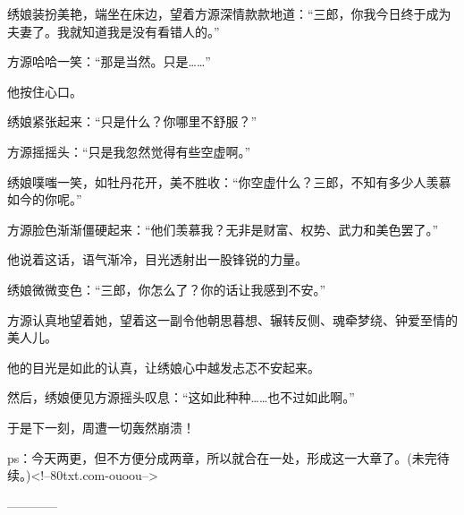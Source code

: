 \begin{this_body}
绣娘装扮美艳，端坐在床边，望着方源深情款款地道：“三郎，你我今日终于成为夫妻了。我就知道我是没有看错人的。”

方源哈哈一笑：“那是当然。只是……”

他按住心口。

绣娘紧张起来：“只是什么？你哪里不舒服？”

方源摇摇头：“只是我忽然觉得有些空虚啊。”

绣娘噗嗤一笑，如牡丹花开，美不胜收：“你空虚什么？三郎，不知有多少人羡慕如今的你呢。”

方源脸色渐渐僵硬起来：“他们羡慕我？无非是财富、权势、武力和美色罢了。”

他说着这话，语气渐冷，目光透射出一股锋锐的力量。

绣娘微微变色：“三郎，你怎么了？你的话让我感到不安。”

方源认真地望着她，望着这一副令他朝思暮想、辗转反侧、魂牵梦绕、钟爱至情的美人儿。

他的目光是如此的认真，让绣娘心中越发忐忑不安起来。

然后，绣娘便见方源摇头叹息：“这如此种种……也不过如此啊。”

于是下一刻，周遭一切轰然崩溃！

ps：今天两更，但不方便分成两章，所以就合在一处，形成这一大章了。(未完待续。)<!--80txt.com-ouoou-->

------------

\end{this_body}

